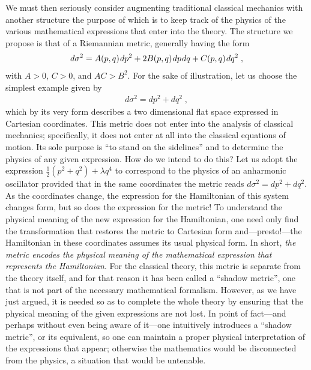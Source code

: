 \documentclass[12pt]{article}
\def\half{\textstyle{\frac{1}{2}}}
\def\s{\hskip.08em}
\def\bn{\begin{eqnarray}}     %
\def\en{\end{eqnarray}}       %
\begin{document}
We must then seriously consider augmenting traditional classical mechanics 
with another structure the purpose of which is to keep track of the physics 
of the various mathematical expressions that enter into the theory. The 
structure we propose is that of a Riemannian metric, generally having the form
  \bn  d\sigma^2=A(p,q)\s dp^2+2B(p,q)\s dp\s dq+C(p,q)\s dq^2\;,  \en
with $A>0$, $C>0$, and $AC>B^2$. 
For the sake of illustration, let us choose the simplest example given by
  \bn  d\sigma^2=dp^2+dq^2 \;,  \en
which by its very form describes a two dimensional flat space expressed in
Cartesian coordinates. This metric does not enter into the analysis of 
classical mechanics; specifically, it does not enter at all into the 
classical equations of motion. Its sole purpose is ``to stand on the 
sidelines'' and to determine the physics of any given expression. How do 
we intend to do this? Let us adopt the expression $\half(p^2+q^2)+
\lambda q^4$ to correspond to the physics of an anharmonic oscillator 
provided that in the same coordinates the metric reads 
$d\sigma^2=dp^2+dq^2$. As the coordinates change, the expression for the 
Hamiltonian of this system changes form, but so does the expression for 
the metric! To understand the physical meaning of the new expression for 
the Hamiltonian, one need only find the transformation that restores the 
metric to Cartesian form and---presto!---the Hamiltonian in these 
coordinates assumes its usual physical form. In short, {\it the metric 
encodes the physical meaning of the mathematical expression that 
represents the Hamiltonian}. For the classical theory, this metric is 
separate from the theory itself, and for that reason it has been called 
a ``shadow metric'', one that is not part of the necessary mathematical 
formalism. However, as we have just argued, it is needed so as to complete 
the whole theory by ensuring that the physical meaning of the given 
expressions are not lost. In point of fact---and perhaps without even 
being aware of it---one intuitively introduces a ``shadow metric'', or 
its equivalent, so one can maintain a proper physical interpretation of 
the expressions that appear; otherwise the mathematics would be 
disconnected from the physics, a situation that would be untenable. 
\end{document}
